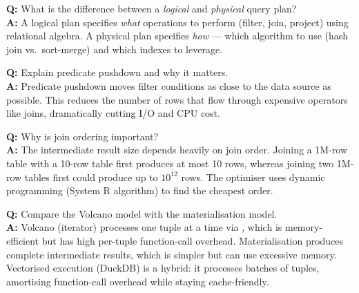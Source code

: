\begin{interviewbox}
\textbf{Q:} What is the difference between a \emph{logical} and \emph{physical} query plan?\\[4pt]
\textbf{A:} A logical plan specifies \emph{what} operations to perform (filter, join, project) using relational algebra.  A physical plan specifies \emph{how} --- which algorithm to use (hash join vs.\ sort-merge) and which indexes to leverage.

\vspace{6pt}
\textbf{Q:} Explain predicate pushdown and why it matters.\\[4pt]
\textbf{A:} Predicate pushdown moves filter conditions as close to the data source as possible.  This reduces the number of rows that flow through expensive operators like joins, dramatically cutting I/O and CPU cost.

\vspace{6pt}
\textbf{Q:} Why is join ordering important?\\[4pt]
\textbf{A:} The intermediate result size depends heavily on join order.  Joining a 1M-row table with a 10-row table first produces at most 10 rows, whereas joining two 1M-row tables first could produce up to $10^{12}$ rows.  The optimiser uses dynamic programming (System R algorithm) to find the cheapest order.

\vspace{6pt}
\textbf{Q:} Compare the Volcano model with the materialisation model.\\[4pt]
\textbf{A:} Volcano (iterator) processes one tuple at a time via , which is memory-efficient but has high per-tuple function-call overhead.  Materialisation produces complete intermediate results, which is simpler but can use excessive memory.  Vectorised execution (DuckDB) is a hybrid: it processes batches of tuples, amortising function-call overhead while staying cache-friendly.
\end{interviewbox}
